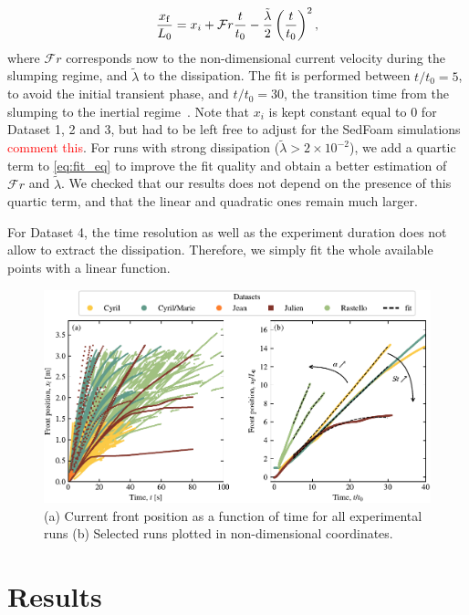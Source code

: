 \documentclass[twocolumn]{article}
\begin{document}
\begin{equation}
	\label{eq:fit_eq}
	\frac{x_{\rm f}}{L_{0}} = x_{i} + \mathcal{F}r \frac{t}{t_{0}} - \frac{\tilde{\lambda}}{2} \left(\frac{t}{t_{0}}\right)^{2},
\end{equation}
where $\mathcal{F}r$ corresponds now to the non-dimensional current velocity during the slumping regime, and $\tilde{\lambda}$ to the dissipation. The fit is performed between $t/t_{0} = 5$, to avoid the initial transient phase, and $t/t_{0} = 30$, the transition time from the slumping to the inertial regime~\citep{refs}. Note that $x_{i}$ is kept constant equal to 0 for Dataset 1, 2 and 3, but had to be left free to adjust for the SedFoam simulations \textcolor{red}{comment this}. For runs with strong dissipation ($\tilde{\lambda} > 2 {\times} 10^{-2}$), we add a quartic term to \eqref{eq:fit_eq} to improve the fit quality and obtain a better estimation of $\mathcal{F}r$ and $\tilde{\lambda}$. We checked that our results does not depend on the presence of this quartic term, and that the linear and quadratic ones remain much larger.

For Dataset 4, the time resolution as well as the experiment duration does not allow to extract the dissipation. Therefore, we simply fit the whole available points with a linear function.

\begin{figure}
	\centering
	\includegraphics{figure3.pdf}
	\caption{(a) Current front position as a function of time for all experimental runs (b) Selected runs plotted in non-dimensional coordinates.}
	\label{fig:fig3}
\end{figure}

\section{Results}
\end{document}

